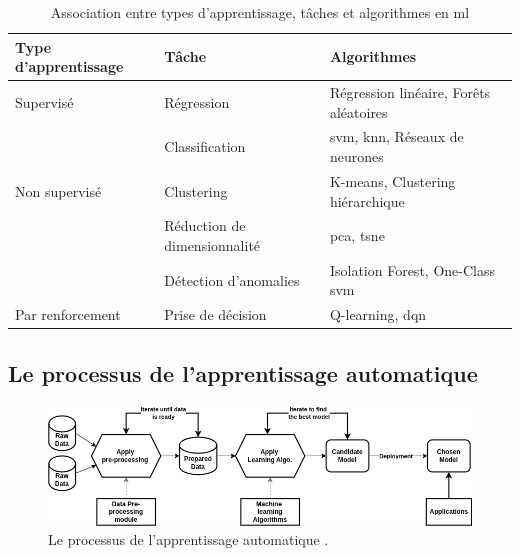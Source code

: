 \begin{table}[h]
\centering
\begin{tabular}{|l|l|l|}
    \hline
    \textbf{Type d'apprentissage} & \textbf{Tâche}             & \textbf{Algorithmes}                       \\ \hline
    Supervisé                     & Régression                 & Régression linéaire, Forêts aléatoires     \\ \cline{2-3} 
                                  & Classification             & \ac{svm}, \ac{knn}, Réseaux de neurones             \\ \hline
    Non supervisé                 & Clustering                 & K-means, Clustering hiérarchique           \\ \cline{2-3} 
                                  & Réduction de dimensionnalité & \ac{pca}, \ac{tsne}                               \\ \cline{2-3}
                                  & Détection d'anomalies      & Isolation Forest, One-Class \ac{svm}            \\ \hline
    Par renforcement              & Prise de décision         & Q-learning, \ac{dqn}            \\ \hline
\end{tabular}
\caption{Association entre types d'apprentissage, tâches et algorithmes en \ac{ml}}
\label{table:mapping-type-task-algorithms}
\end{table}

\subsection{Le processus de l'apprentissage automatique} \hspace{0pt}
\label{ch:1:section:ml-process}

\begin{figure}[H]
    \centering
    \includegraphics[width=15cm]{gfx/fig-machine-learning-process.png}
    \caption{Le processus de l'apprentissage automatique \cite{mlprocess}.}
    \label{fig:mlprocess}
\end{figure}

